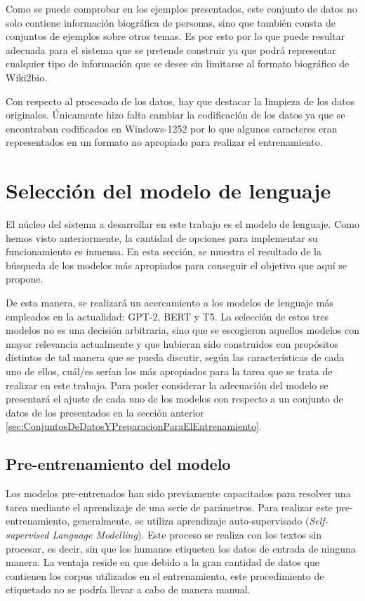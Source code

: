 Como se puede comprobar en los ejemplos presentados, este conjunto de datos no solo contiene información biográfica de personas, sino que también consta de conjuntos de ejemplos sobre otros temas. Es por esto por lo que puede resultar adecuada para el sistema que se pretende construir ya que podrá representar cualquier tipo de información que se desee sin limitarse al formato biográfico de Wiki2bio.


Con respecto al procesado de los datos, hay que destacar la limpieza de los datos originales. Únicamente hizo falta cambiar la codificación de los datos ya que se encontraban codificados en Windows-1252 por lo que algunos caracteres eran representados en un formato no apropiado para realizar el entrenamiento.


\section{Selección del modelo de lenguaje}
\label{sec:seleccion_modelo}

El núcleo del sistema a desarrollar en este trabajo es el modelo de lenguaje. Como hemos visto anteriormente, la cantidad de opciones para implementar su funcionamiento es inmensa. En esta sección, se muestra el resultado de la búsqueda de los modelos más apropiados para conseguir el objetivo que aquí se propone. 

De esta manera, se realizará un acercamiento a los modelos de lenguaje más empleados en la actualidad: GPT-2, BERT y T5. La selección de estos tres modelos no es una decisión arbitraria, sino que se escogieron aquellos modelos con mayor relevancia actualmente y que hubieran sido construidos con propósitos distintos de tal manera que se pueda discutir, según las características de cada uno de ellos, cuál/es serían los más apropiados para la tarea que se trata de realizar en este trabajo. Para poder considerar la adecuación del modelo se presentará el ajuste de cada uno de los modelos con respecto a un conjunto de datos de los presentados en la sección anterior \ref{sec:ConjuntosDeDatosYPreparacionParaElEntrenamiento}.



\subsection{Pre-entrenamiento del modelo}

Los modelos pre-entrenados han sido previamente capacitados para resolver una tarea mediante el aprendizaje de una serie de parámetros. Para realizar este pre-entrenamiento, generalmente, se utiliza aprendizaje auto-supervisado (\textit{Self-supervised Language Modelling}). Este proceso se realiza con los textos sin procesar, es decir, sin que los humanos etiqueten los datos de entrada de ninguna manera. La ventaja reside en que debido a la gran cantidad de datos que contienen los corpus utilizados en el entrenamiento, este procedimiento de etiquetado no se podría llevar a cabo de manera manual. %


